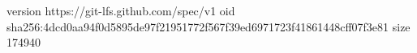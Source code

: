 version https://git-lfs.github.com/spec/v1
oid sha256:4dcd0aa94f0d5895de97f21951772f567f39ed6971723f41861448cff07f3e81
size 174940

